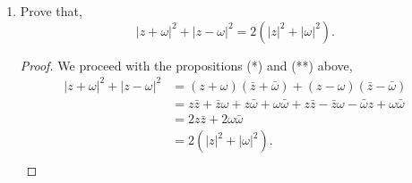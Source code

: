 \documentclass[../hw4]{subfiles}
\begin{document}
\begin{enumerate}[label= (\alph*)]

    \item Prove that, \[{|z+\omega|}^2+{|z-\omega|}^2=2\left( {|z|}^2+{|\omega|}^2 \right).\]
    
    \begin{proof}
        We proceed with the propositions (*) and (**) above,
        \begin{align*}
            {|z+\omega|}^2+{|z-\omega|}^2 &= (z+\omega)(\bar{z}+\bar{\omega})+(z-\omega)(\bar{z}-\bar{\omega}) \\
            &= z\bar{z}+\bar{z}\omega+z\bar{\omega}+\omega\bar{\omega}+z\bar{z}-\bar{z}\omega-\bar{\omega}z+\omega\bar{\omega} \\
            &= 2z\bar{z}+2\omega\bar{\omega} \\
            &= 2\left( {|z|}^2+{|\omega|}^2 \right). \\
        \end{align*}
    \end{proof}
\end{enumerate}
\end{document}
